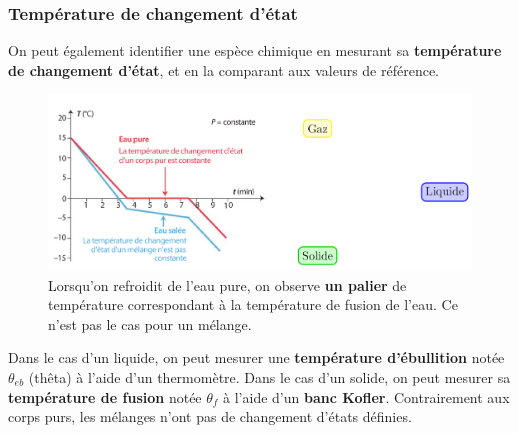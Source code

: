 \documentclass[french, a4paper, 12pt, twocolumn, landscape]{article}
\begin{document}
\subsubsection{Température de changement d'état}

		On peut également identifier une espèce chimique en mesurant sa \textbf{température de changement d'état}, et en la comparant aux valeurs de référence.

		\begin{figure}[ht]
			\centering
			\includegraphics[width=.4\textwidth]{TemperatureChangementDetat.png}
			\caption{Lorsqu'on refroidit de l’eau pure, on observe \textbf{un palier} de température correspondant à la température de fusion de l’eau. Ce n’est pas le cas pour un
			mélange.}
		\end{figure}

		Dans le cas d'un liquide, on peut mesurer une \textbf{température d'ébullition} notée $\theta_{eb}$ (\og{}thêta\fg{}) à l'aide d'un thermomètre. Dans le cas d'un solide, on peut mesurer sa \textbf{température de fusion} notée $\theta_f$ à l'aide d'un \textbf{banc Kofler}. 
		Contrairement aux corps purs, les mélanges n'ont pas de changement d'états définies.
\end{document}
